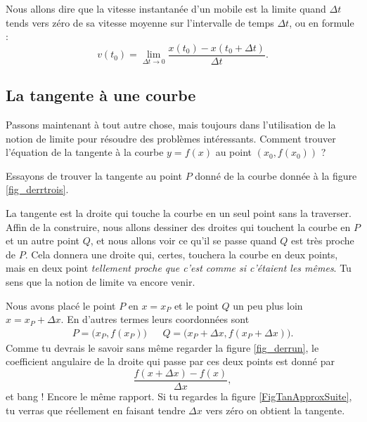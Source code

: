 \documentclass[a4paper,12pt]{book}
\theoremstyle{mes_exemples}	\newtheorem{exemple}[numtho]{Exemple}
\theoremstyle{mes_tho}
\begin{document}
Nous allons dire que la vitesse instantanée d'un mobile est la limite quand $\Delta t$ tends vers zéro de sa vitesse moyenne sur l'intervalle de temps $\Delta t$, ou en formule :
\begin{equation}		\label{Eqvinstlimite}
	v(t_0)=\lim_{\Delta t\to 0}\frac{ x(t_0)-x(t_0+\Delta t) }{ \Delta t }.
\end{equation}

					\subsection{La tangente à une courbe}

Passons maintenant à tout autre chose, mais toujours dans l'utilisation de la notion de limite pour résoudre des problèmes intéressants. Comment trouver l'équation de la tangente à la courbe $y=f(x)$ au point $(x_0,f(x_0))$ ?

Essayons de trouver la tangente au point $P$ donné de la courbe donnée à la figure \ref{fig_derrtrois}.







La tangente est la droite qui touche la courbe en un seul point sans la traverser. Affin de la construire, nous allons dessiner des droites qui touchent la courbe en $P$ et un autre point $Q$, et nous allons voir ce qu'il se passe quand $Q$ est très proche de $P$. Cela donnera une droite qui, certes, touchera la courbe en deux points, mais en deux point \emph{tellement proche que c'est comme si c'étaient les mêmes}. Tu sens que la notion de limite va encore venir.

Nous avons placé le point $P$ en $x=x_P$ et le point $Q$ un peu plus loin $x=x_P+\Delta x$. En d'autres termes leurs coordonnées sont
\begin{align}
	P=\big(x_P,f(x_P)\big)&& Q=\big(x_P+\Delta x,f(x_P+\Delta x)\big).
\end{align}
Comme tu devrais le savoir sans même regarder la figure \ref{fig_derrun}, le coefficient angulaire de la droite qui passe par ces deux points est donné par
\begin{equation}
	\frac{ f(x+\Delta x)-f(x) }{ \Delta x },
\end{equation}
et bang ! Encore le même rapport. Si tu regardes la figure \ref{FigTanApproxSuite}, tu verras que réellement en faisant tendre $\Delta x$ vers zéro on obtient la tangente.
\end{document}
